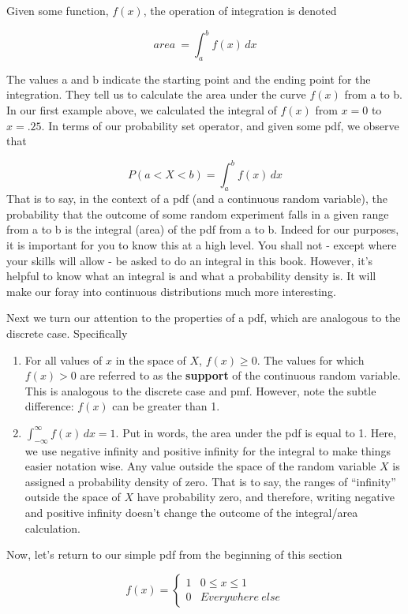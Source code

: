\documentclass[
]{book}
\theoremstyle{definition}
\theoremstyle{definition}
\theoremstyle{definition}
\theoremstyle{definition}
\theoremstyle{remark}
\begin{document}
Given some function, \(f(x)\), the operation of integration is denoted

\[
area \:=\int_{a}^{b} f(x) \,dx
\]

The values a and b indicate the starting point and the ending point for the integration. They tell us to calculate the area under the curve \(f(x)\) from a to b. In our first example above, we calculated the integral of \(f(x)\) from \(x = 0\) to \(x = .25\). In terms of our probability set operator, and given some pdf, we observe that

\[
P(a < X < b) = \int_{a}^{b} f(x) \, dx
\]
That is to say, in the context of a pdf (and a continuous random variable), the probability that the outcome of some random experiment falls in a given range from a to b is the integral (area) of the pdf from a to b. Indeed for our purposes, it is important for you to know this at a high level. You shall not - except where your skills will allow - be asked to do an integral in this book. However, it's helpful to know what an integral is and what a probability density is. It will make our foray into continuous distributions much more interesting.

Next we turn our attention to the properties of a pdf, which are analogous to the discrete case. Specifically

\begin{enumerate}
\def\labelenumi{\arabic{enumi}.}
\item
  For all values of \(x\) in the space of \(X\), \(f(x) \geq 0\). The values for which \(f(x) > 0\) are referred to as the \textbf{support} of the continuous random variable. This is analogous to the discrete case and pmf. However, note the subtle difference: \(f(x)\) can be greater than 1.
\item
  \(\int_{-\infty}^{\infty} f(x) \, dx = 1\). Put in words, the area under the pdf is equal to 1. Here, we use negative infinity and positive infinity for the integral to make things easier notation wise. Any value outside the space of the random variable \(X\) is assigned a probability density of zero. That is to say, the ranges of ``infinity'' outside the space of \(X\) have probability zero, and therefore, writing negative and positive infinity doesn't change the outcome of the integral/area calculation.
\end{enumerate}

Now, let's return to our simple pdf from the beginning of this section

\[
f(x) = 
\begin{cases}
1 & 0 \leq x \leq 1 \\
0 & Everywhere \: else
\end{cases}
\]
\end{document}
